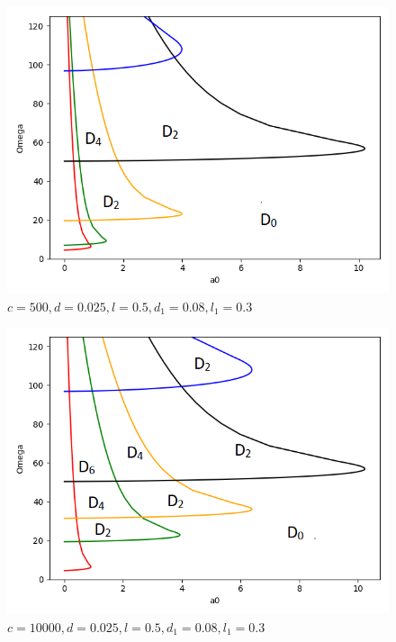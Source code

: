 \documentclass[12pt, a4paper]{extarticle}
\begin{document}
\begin{figure}[h!]
 \centering
 \includegraphics[scale=0.8]{D-razb_c=500}
 \caption{$c=500, d=0.025, l=0.5, d_1=0.08, l_1=0.3$}
\end{figure}
\begin{figure}[h!]
 \centering
 \includegraphics[scale=0.8]{D-razb_c=10000}
 \caption{$c=10000, d=0.025, l=0.5, d_1=0.08, l_1=0.3$}
\end{figure}


\newpage
\end{document}
